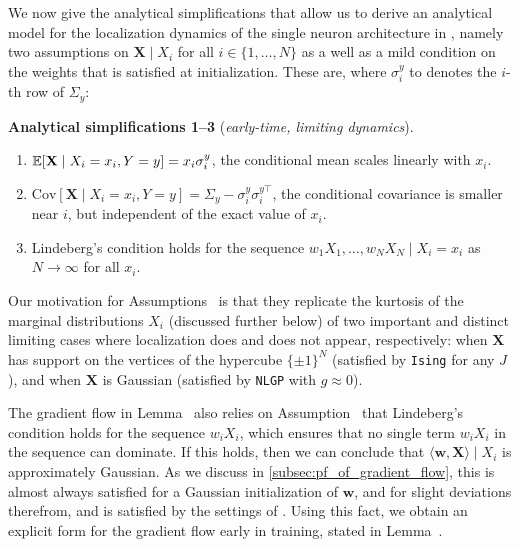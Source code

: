 We now give the analytical simplifications that allow us to derive an analytical model for the localization dynamics of the single neuron architecture in , namely
two assumptions on $\mathbf{X} \mid X_i$ for all $i \in \{1, \dots, N\}$ as a well as a mild condition on the weights that is satisfied at initialization.
These are, where $\sigma_i^y$ to denotes the $i$-th row of $\Sigma_y$:

\begin{analysis}{\textbf{Analytical simplifications 1--3} (\emph{early-time, limiting dynamics}).}{}
\begin{enumerate}[series=assumenumi]
  \item \label{item:mean-assumption} $\operatorname{\mathbb{E}}[\mathbf{X} \mid X_i = x_i, Y = y] = x_i \sigma_i^y$, \ie the conditional mean scales linearly with $x_i$.
  \item \label{item:covariance-assumption} $\text{Cov}[\mathbf{X} \mid X_i = x_i, Y = y] = \Sigma_y - \sigma_i^y \sigma_i^{y\top}$, \ie the conditional covariance is smaller near $i$, but independent of the exact value of $x_i$.
  \item \label{item:lindeberg-condition} Lindeberg's condition holds for the sequence $w_1 X_1, \ldots, w_N X_N \mid X_i = x_i$ as $N \to \infty$ for all $x_i$.
\end{enumerate}
\end{analysis}

Our motivation for Assumptions~ is that they replicate the kurtosis of the marginal distributions $X_i$ (discussed further below) of two important and distinct limiting cases where localization does and does not appear, respectively:
when $\mathbf{X}$ has support on the vertices of the hypercube $\{ \pm 1 \}^N$ (satisfied by \texttt{Ising} for any $J$), and
when $\mathbf{X}$ is Gaussian (satisfied by \texttt{NLGP} with $g \approx 0$).

The gradient flow in Lemma~ also relies on Assumption~ that Lindeberg's condition holds for the sequence $w_i X_i$, which ensures that no single term $w_i X_i$ in the sequence can dominate.
If this holds, then we can conclude that $\langle \mathbf{w}, \mathbf{X} \rangle \mid X_i$ is approximately Gaussian.
As we discuss in \cref{subsec:pf_of_gradient_flow}, this is almost always satisfied for a Gaussian initialization of $\mathbf{w}$, and for slight deviations therefrom, and is satisfied by the settings of \textcite{ingrosso2022data}.
Using this fact, we obtain an explicit form for the gradient flow early in training, stated in Lemma~.

